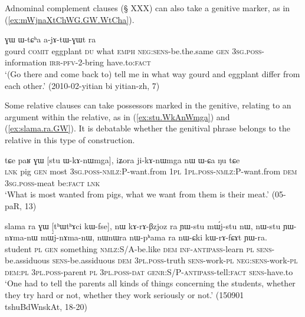 Adnominal complement clauses (§ XXX) can also take a genitive marker, as in (\ref{ex:mWjnaXtChWG.GW.WtCha}).

\begin{exe}
\ex \label{ex:mWjnaXtChWG.GW.WtCha}
 ɣɯ ɯ-tɕʰa a-jɤ-tɯ-ɣɯt ra \\
gourd \textsc{comit} eggplant \textsc{du} what \textsc{emph} \textsc{neg}:\textsc{sens}-be.the.same \textsc{gen} \textsc{3sg}.\textsc{poss}-information \textsc{irr}-\textsc{pfv}-2-bring have.to:\textsc{fact} \\
\glt `(Go there and come back to) tell me in what way gourd and eggplant differ from each other.' (2010-02-yitian bi yitian-zh, 7)
\end{exe}

Some relative clauses can take possessors marked in the genitive, relating to an argument within the relative, as in  (\ref{ex:stu.WkAnWmga}) and (\ref{ex:slama.ra.GW}). It is debatable whether the genitival phrase belongs to the relative in this type of construction.

\begin{exe}
\ex \label{ex:stu.WkAnWmga}
 \gll tɕe paʁ ɣɯ [stu ɯ-kɤ-nɯmga], iʑora ji-kɤ-nɯmga nɯ ɯ-ɕa ŋu tɕe \\
 \textsc{lnk} pig \textsc{gen} most \textsc{3sg}.\textsc{poss}-\textsc{nmlz}:P-want.from \textsc{1pl} \textsc{1pl}.\textsc{poss}-\textsc{nmlz}:P-want.from \textsc{dem} \textsc{3sg}.\textsc{poss}-meat be:\textsc{fact} \textsc{lnk} \\
\glt  `What is most wanted from pigs, what we want from them is their meat.' (05-paR, 13)
\end{exe}

\begin{exe}
\ex \label{ex:slama.ra.GW}
\gll  slama ra ɣɯ [tʰɯtʰɤci kɯ-fse], nɯ kɤ-rɤ-βzjoz ra ɲɯ-stu mɯ́j-stu nɯ, nɯ-stu ɲɯ-nɤma-nɯ mɯ́j-nɤma-nɯ,  nɯnɯra nɯ-pʰama ra nɯ-ɕki kɯ-rɤ-fɕɤt ɲɯ-ra. \\
student \textsc{pl} \textsc{gen} something \textsc{nmlz}:S/A-be.like \textsc{dem}  \textsc{inf}-\textsc{antipass}-learn \textsc{pl} \textsc{sens}-be.assiduous \textsc{sens}-be.assiduous \textsc{dem} \textsc{3pl}.\textsc{poss}-truth \textsc{sens}-work-\textsc{pl} \textsc{neg:sens}-work-\textsc{pl} \textsc{dem}:\textsc{pl} \textsc{3pl}.\textsc{poss}-parent \textsc{pl} \textsc{3pl}.\textsc{poss}-\textsc{dat} \textsc{genr}:S/P-\textsc{antipass}-tell:\textsc{fact} \textsc{sens}-have.to \\
\glt `One had to tell the parents all kinds of things concerning the students, whether they try hard or not, whether they work seriously or not.' (150901 tshuBdWnskAt, 18-20)
\end{exe}

